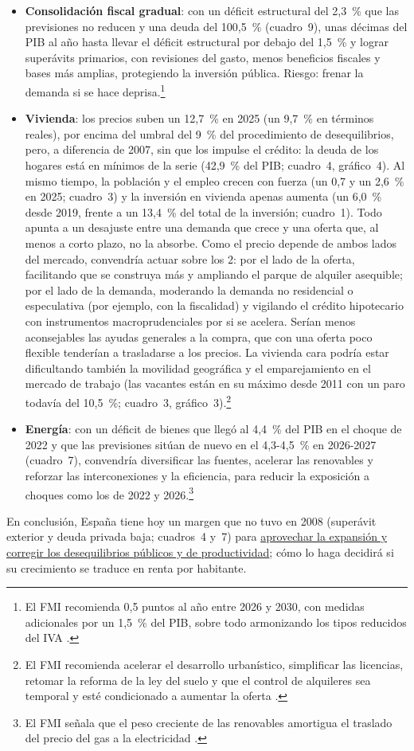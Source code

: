 \begin{examen}
\begin{itemize}
\item \textbf{Consolidación fiscal gradual}: con un déficit estructural del 2,3~\% que las previsiones no reducen y una deuda del 100,5~\% (cuadro~9), unas décimas del PIB al año hasta llevar el déficit estructural por debajo del 1,5~\% y lograr superávits primarios, con revisiones del gasto, menos beneficios fiscales y bases más amplias, protegiendo la inversión pública. Riesgo: frenar la demanda si se hace deprisa.\footnote{El FMI recomienda 0,5 puntos al año entre 2026 y 2030, con medidas adicionales por un 1,5~\% del PIB, sobre todo armonizando los tipos reducidos del IVA .}
\item \textbf{Vivienda}: los precios suben un 12,7~\% en 2025 (un 9,7~\% en términos reales), por encima del umbral del 9~\% del procedimiento de desequilibrios, pero, a diferencia de 2007, sin que los impulse el crédito: la deuda de los hogares está en mínimos de la serie (42,9~\% del PIB; cuadro~4, gráfico~4). Al mismo tiempo, la población y el empleo crecen con fuerza (un 0,7 y un 2,6~\% en 2025; cuadro~3) y la inversión en vivienda apenas aumenta (un 6,0~\% desde 2019, frente a un 13,4~\% del total de la inversión; cuadro~1). Todo apunta a un desajuste entre una demanda que crece y una oferta que, al menos a corto plazo, no la absorbe. Como el precio depende de ambos lados del mercado, convendría actuar sobre los 2: por el lado de la oferta, facilitando que se construya más y ampliando el parque de alquiler asequible; por el lado de la demanda, moderando la demanda no residencial o especulativa (por ejemplo, con la fiscalidad) y vigilando el crédito hipotecario con instrumentos macroprudenciales por si se acelera. Serían menos aconsejables las ayudas generales a la compra, que con una oferta poco flexible tenderían a trasladarse a los precios. La vivienda cara podría estar dificultando también la movilidad geográfica y el emparejamiento en el mercado de trabajo (las vacantes están en su máximo desde 2011 con un paro todavía del 10,5~\%; cuadro~3, gráfico~3).\footnote{El FMI recomienda acelerar el desarrollo urbanístico, simplificar las licencias, retomar la reforma de la ley del suelo y que el control de alquileres sea temporal y esté condicionado a aumentar la oferta .}
\item \textbf{Energía}: con un déficit de bienes que llegó al 4,4~\% del PIB en el choque de 2022 y que las previsiones sitúan de nuevo en el 4,3-4,5~\% en 2026-2027 (cuadro~7), convendría diversificar las fuentes, acelerar las renovables y reforzar las interconexiones y la eficiencia, para reducir la exposición a choques como los de 2022 y 2026.\footnote{El FMI señala que el peso creciente de las renovables amortigua el traslado del precio del gas a la electricidad .}
\end{itemize}
En conclusión, España tiene hoy un margen que no tuvo en 2008 (superávit exterior y deuda privada baja; cuadros~4 y~7) para \uline{aprovechar la expansión y corregir los desequilibrios públicos y de productividad}; cómo lo haga decidirá si su crecimiento se traduce en renta por habitante.
\end{examen}

